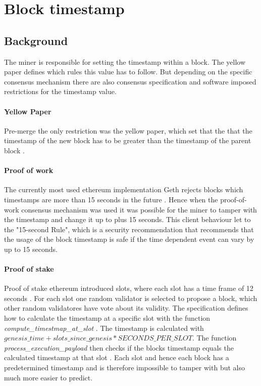 \section{Block timestamp}

\subsection{Background} 
The miner is responsible for setting the timestamp within a block. The yellow
paper defines which rules this value has to follow. But depending on the
specific consensus mechanism there are also consensus specification and
software imposed restrictions for the timestamp value. 

\paragraph{Yellow Paper}
Pre-merge the only restriction was the yellow paper, which set that the that
the timestamp of the new block has to be greater than the timestamp of the
parent block \cite{ethyellowpaper2023}.

\paragraph{Proof of work}
The currently most used ethereum implementation Geth rejects blocks which
timestamps are more than 15 seconds in the future
\cite{go-ethereum-15-sek-limit}. Hence when the proof-of-work consensus
mechanism was used it was possible for the miner to tamper with the timestamp
and change it up to plus 15 seconds. This client behaviour let to the
"15-second Rule", which is a security recommendation that recommends that the
usage of the block timestamp is safe if the time dependent event can vary by up
to 15 seconds.

\paragraph{Proof of stake}
Proof of stake ethereum introduced slots, where each slot has a time frame of
12 seconds \cite{seconds-per-slot-mainnet}\cite{seconds-per-slot-mainnet-doc}.
For each slot one random validator is selected to propose a block, which other
random validatores have vote about its validity. The specification defines
how to calculate the timestamp at a specific slot with the function
\textit{compute\_timestmap\_at\_slot} \cite{compute-timestamp-at-slot}. The
timestamp is calculated with $genesis\_time + slots\_since\_genesis *
SECONDS\_PER\_SLOT$. The function \textit{process\_execution\_payload} then
checks if the blocks timestamp equals the calculated timestamp at that slot
\cite{process-execution-payload}. Each slot and hence each block has
a predetermined timestamp and is therefore impossible to tamper with but
also much more easier to predict.

